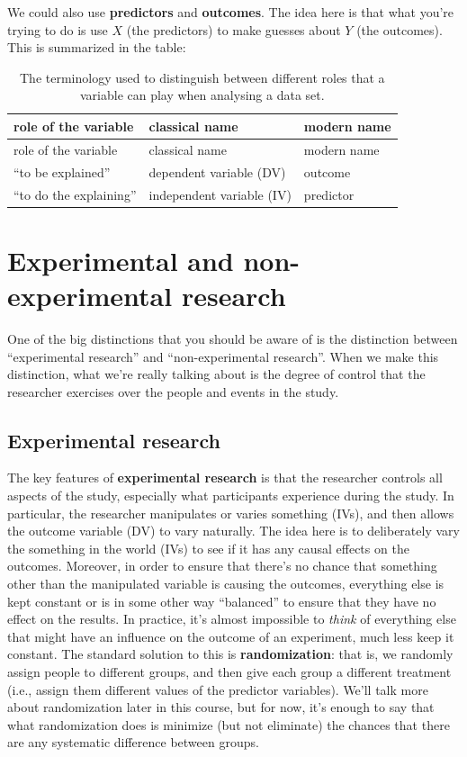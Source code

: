 \documentclass[]{book}
\begin{document}
We could also use \textbf{predictors} and \textbf{outcomes}. The idea here is that what you're trying to do is use \(X\) (the predictors) to make guesses about \(Y\) (the outcomes). This is summarized in the table:

\begin{longtable}[]{@{}lll@{}}
\caption{The terminology used to distinguish between different roles that a variable can play when analysing a data set.}\tabularnewline
\toprule
role of the variable & classical name & modern name\tabularnewline
\midrule
\endfirsthead
\toprule
role of the variable & classical name & modern name\tabularnewline
\midrule
\endhead
``to be explained'' & dependent variable (DV) & outcome\tabularnewline
``to do the explaining'' & independent variable (IV) & predictor\tabularnewline
\bottomrule
\end{longtable}

\hypertarget{experimental-and-non-experimental-research}{%
\section{Experimental and non-experimental research}\label{experimental-and-non-experimental-research}}

One of the big distinctions that you should be aware of is the distinction between ``experimental research'' and ``non-experimental research''. When we make this distinction, what we're really talking about is the degree of control that the researcher exercises over the people and events in the study.

\hypertarget{experimental-research}{%
\subsection{Experimental research}\label{experimental-research}}

The key features of \textbf{experimental research} is that the researcher controls all aspects of the study, especially what participants experience during the study. In particular, the researcher manipulates or varies something (IVs), and then allows the outcome variable (DV) to vary naturally. The idea here is to deliberately vary the something in the world (IVs) to see if it has any causal effects on the outcomes. Moreover, in order to ensure that there's no chance that something other than the manipulated variable is causing the outcomes, everything else is kept constant or is in some other way ``balanced'' to ensure that they have no effect on the results. In practice, it's almost impossible to {\emph{think}} of everything else that might have an influence on the outcome of an experiment, much less keep it constant. The standard solution to this is \textbf{randomization}: that is, we randomly assign people to different groups, and then give each group a different treatment (i.e., assign them different values of the predictor variables). We'll talk more about randomization later in this course, but for now, it's enough to say that what randomization does is minimize (but not eliminate) the chances that there are any systematic difference between groups.
\end{document}
